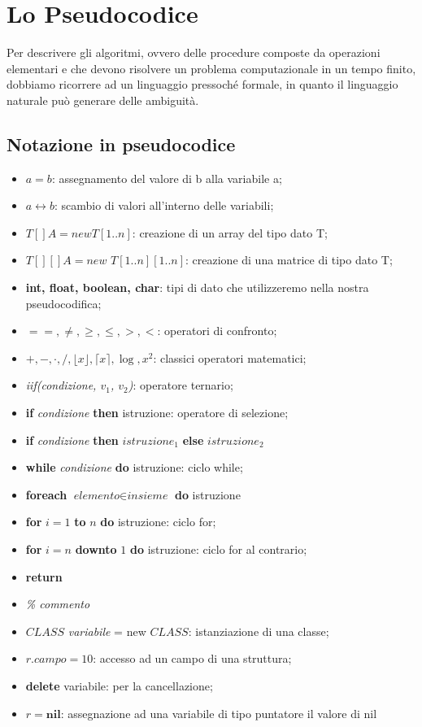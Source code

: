 \documentclass[../cheatSheetAlgoritmi.tex]{subfiles}
\begin{document}
\chapter{Lo Pseudocodice}
Per descrivere gli algoritmi, ovvero delle procedure composte da operazioni elementari e che devono risolvere un problema computazionale in un tempo finito, dobbiamo ricorrere ad un linguaggio pressoché formale, in quanto il linguaggio naturale può generare delle ambiguità.

\section{Notazione in pseudocodice}
\begin{itemize}
  	\item $a=b$: assegnamento del valore di b alla variabile a;
  	\item $a \leftrightarrow b$: scambio di valori all'interno delle variabili;
  	\item $T[] A = new T[1..n]$: creazione di un array del tipo dato T;
  	\item $T[][] A = new$ $T[1..n][1..n]$: creazione di una matrice di tipo dato T;
  	\item \textbf{int, float, boolean, char}: tipi di dato che utilizzeremo nella nostra pseudocodifica;
  	\item $==, \neq, \geq, \leq, >, <$: operatori di confronto;
  	\item $+, -, \cdot, /, \lfloor x \rfloor, \lceil x \rceil, \log, x^2$: classici operatori matematici;
  	\item \textit{iif(condizione, $v_1$, $v_2$)}: operatore ternario;
  	\item \textbf{if} \textit{condizione} \textbf{then} istruzione: operatore di selezione;
  	\item \textbf{if} \textit{condizione} \textbf{then} $istruzione_1$ \textbf{else} $istruzione_2$
  	\item \textbf{while} \textit{condizione} \textbf{do} istruzione: ciclo while;
  	\item \textbf{foreach} $\textit{elemento} \in \textit{insieme}$ \textbf{do} istruzione
  	\item \textbf{for} $i = 1$ \textbf{to} $n$ \textbf{do} istruzione: ciclo for;
  	\item \textbf{for} $i = n$ \textbf{downto} $1$ \textbf{do} istruzione: ciclo for al contrario;
  	\item \textbf{return}
  	\item \textit{\% commento}
  	\item $CLASS$ \textit{variabile} = new $CLASS$: istanziazione di una classe;
  	\item $\textit{r.campo}= 10$: accesso ad un campo di una struttura;
  	\item \textbf{delete} variabile: per la cancellazione;
	\item $r = \textbf{nil}$: assegnazione ad una variabile di tipo puntatore il valore di nil
\end{itemize}
\end{document}
